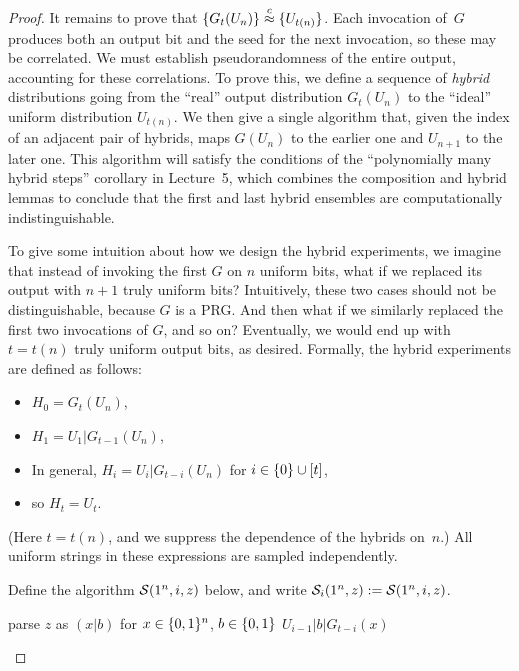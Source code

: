 \documentclass[11pt]{article}
\begin{document}
\begin{proof}
  It remains to prove that $\{G_t(U_n)\}\stackrel{c}{\approx}\{U_{t(n)}\}$.
  Each invocation of~$G$ produces both an output bit and the seed for the next invocation, so these may be correlated.
  We must establish pseudorandomness of the entire output, accounting for these correlations.
  To prove this, we define a sequence of \emph{hybrid} distributions going from the ``real'' output distribution $G_t(U_n)$ to the ``ideal'' uniform distribution $U_{t(n)}$.
  We then give a single algorithm that, given the index of an adjacent pair of hybrids, maps $G(U_n)$ to the earlier one and $U_{n+1}$ to the later one.
  This algorithm will satisfy the conditions of the ``polynomially many hybrid steps'' corollary in Lecture~5, which combines the composition and hybrid lemmas to conclude that the first and last hybrid ensembles are computationally indistinguishable.

  To give some intuition about how we design the hybrid experiments, we imagine that instead of invoking the first $G$ on $n$ uniform bits, what if we replaced its output with $n+1$ truly uniform bits?
  Intuitively, these two cases should not be distinguishable, because $G$ is a PRG.
  And then what if we similarly replaced the first two invocations of $G$, and so on?
  Eventually, we would end up with $t = t(n)$ truly uniform output bits, as desired.
  Formally, the hybrid experiments are defined as follows:
  \begin{itemize}[itemsep=0pt]
  \item $H_0 = G_t(U_n)$,
  \item $H_1 = U_1 | G_{t-1}(U_n)$,
  \item In general, $H_i = U_i | G_{t-i}(U_n)$ for $i \in \{0\} \cup [t]$,
  \item so $H_t = U_{t}$.
  \end{itemize}
  (Here $t=t(n)$, and we suppress the dependence of the hybrids on~$n$.)
  All uniform strings in these expressions are sampled independently.

  Define the algorithm $\Sim(1^n,i,z)$ below, and write $\mathcal{S}_i(1^n,z):=\mathcal{S}(1^n,i,z)$.
  \begin{algorithm}[h]
    \caption{$\Sim(1^n,i,z)$ for $i\in[t(n)]$ and $z\in\bit^{n+1}$}
    \begin{algorithmic}
      \STATE parse $z$ as $(x|b)$ for $x \in \{0,1\}^{n}$, $b \in \{0,1\}$
      \RETURN $U_{i-1} | b | G_{t-i}(x)$
    \end{algorithmic}
  \end{algorithm}


\end{proof}
\end{document}
